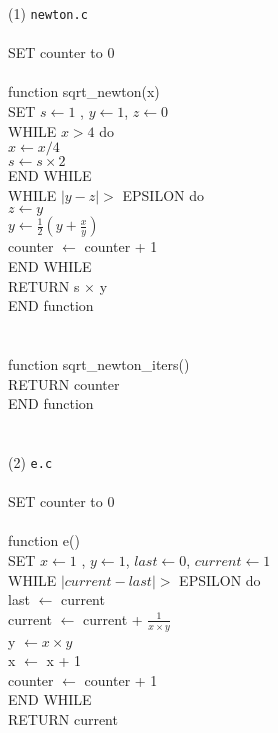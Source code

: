 \documentclass[12pt]{article}
\begin{document}
(1) \texttt{newton.c} \\
\\
SET counter to 0 \\
\\
function sqrt\_newton(x) \\
\indent SET $s \leftarrow 1$ , $y \leftarrow 1$, $z \leftarrow 0$ \\
\indent WHILE $x > 4$ do \\
\indent \indent $x \leftarrow x / 4$ \\
\indent \indent $s \leftarrow s \times 2$ \\
\indent END WHILE \\
\indent WHILE $| y - z | >$ EPSILON do \\
\indent \indent $z \leftarrow y$ \\
\indent \indent $y \leftarrow \frac{1}{2} (y + \frac{x}{y})$  \\
\indent \indent counter $\leftarrow$ counter + 1 \\
\indent END WHILE \\
\indent RETURN s $\times$ y \\
END function \\
\\
\\
function sqrt\_newton\_iters() \\
\indent RETURN counter \\
END function \\
\\
\\
(2) \texttt{e.c} \\
\\
SET counter to 0 \\
\\
function e() \\
\indent SET $x \leftarrow 1$ , $y \leftarrow 1$, $last \leftarrow 0$, $current \leftarrow 1$ \\
\indent WHILE $| current - last | >$ EPSILON do \\
\indent \indent last $\leftarrow$ current \\
\indent \indent current $\leftarrow$ current + $\frac{1}{x \times y}$ \\
\indent \indent y $\leftarrow x \times y$ \\
\indent \indent x $\leftarrow$ x + 1 \\
\indent \indent counter $\leftarrow$ counter + 1 \\
\indent END WHILE \\
\indent RETURN current \\
\end{document}
